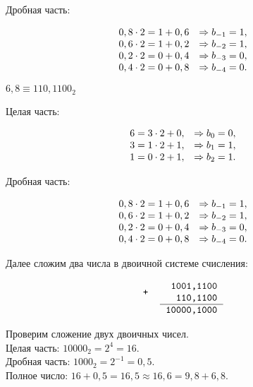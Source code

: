 \documentclass[a4paper,14pt]{extarticle}
\begin{document}
	Дробная часть:
	
	\[
	\begin{array}[c]{ll}
		0,8 \cdot 2 = 1 + 0,6 &\Rightarrow b_{-1} = 1,\\
		0,6 \cdot 2 = 1 + 0,2 &\Rightarrow b_{-2} = 1,\\
		0,2 \cdot 2 = 0 + 0,4 &\Rightarrow b_{-3} = 0,\\
		0,4 \cdot 2 = 0 + 0,8 &\Rightarrow b_{-4} = 0.\\
	\end{array}
	\]
	
	$6,8 \equiv 110,1100_{2}$
	
	Целая часть:
	
	\[
	\begin{array}[c]{ll}
		6 = 3 \cdot 2 + 0, &\Rightarrow b_{0} = 0,\\
		3 = 1 \cdot 2 + 1, &\Rightarrow b_{1} = 1,\\
		1 = 0 \cdot 2 + 1, &\Rightarrow b_{2} = 1.
	\end{array}
	\]
	
	Дробная часть:
	
	\[
	\begin{array}[c]{ll}
		0,8 \cdot 2 = 1 + 0,6 &\Rightarrow b_{-1} = 1,\\
		0,6 \cdot 2 = 1 + 0,2 &\Rightarrow b_{-2} = 1,\\
		0,2 \cdot 2 = 0 + 0,4 &\Rightarrow b_{-3} = 0,\\
		0,4 \cdot 2 = 0 + 0,8 &\Rightarrow b_{-4} = 0.\\
	\end{array}
	\]
	
	Далее сложим два числа в двоичной системе счисления:
	
	\[
	\begin{tabular}{{c}{c}}
		\texttt{+} &
		\begin{tabular}{c}
			\texttt{~1001,1100}\\
			\texttt{~~110,1100}\\
			\hline
		\end{tabular}\\
		& \texttt{10000,1000}
	\end{tabular}
	\]
	
	Проверим сложение двух двоичных чисел.\\
	Целая часть: $10000_{2}=2^{4}=16$.\\
	Дробная часть: $1000_{2}=2^{-1}=0,5$.\\
	Полное число: $16+0,5=16,5 \approx 16,6=9,8+6,8$.
	
\end{document}
